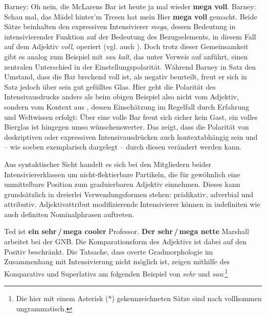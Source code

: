 \ea  \label{Expr01}
\ea Barney: \glqq{}Oh nein, die McLarens Bar ist heute ja mal wieder \textbf{mega voll}.\grqq{}
\hfill \textbf{}  \qquad   \dSadey[1.25][orange!69]     \label{barbar}
\ex Barney: \glqq{}Schau mal, das Mädel hinter'm Tresen hat mein Bier \textbf{mega voll} gemacht.\grqq{}
\hfill {}  \qquad \dSmiley[1.25][green!35]  \label{barbier}
 \z
 \z
Beide Sätze beinhalten den expressiven Intensivierer \textit{mega}, dessen Bedeutung in intensivierender Funktion auf der Bedeutung des Bezugselements, in diesem Fall auf dem Adjektiv \textit{voll}, operiert (vgl. auch \citealt[15f.]{Nouwen.2020}). Doch trotz dieser Gemeinsamkeit gibt es analog zum Beispiel mit \textit{sau kalt}, das {\citet[135]{Gutzmann.2019a}} unter Verweis auf \citet[681]{McCready.2008} anführt, einen zentralen Unterschied in der Einstellungspolarität. Während Barney {in Satz } den Umstand, dass die Bar brechend voll ist, als negativ beurteilt, freut er sich in Satz  jedoch über sein gut gefülltes Glas. Hier geht die Polarität des Intensivausdrucks anders als beim obigen Beispiel  also nicht vom Adjektiv, sondern vom Kontext aus {\citep[vgl.][135]{Gutzmann.2019a}}, dessen Einschätzung im Regelfall durch Erfahrung und Weltwissen erfolgt: Über eine volle Bar freut sich sicher kein Gast, ein volles Bierglas ist hingegen umso wünschenswerter. Das zeigt, dass die Polarität von deskriptiven oder expressiven Intensivausdrücken auch kontextabhängig sein und -- wie soeben exemplarisch dargelegt -- durch diesen verändert werden kann.

Aus syntaktischer Sicht handelt es sich bei den Mitgliedern beider Intensiviererklassen um nicht-flektierbare Partikeln, die für gewöhnlich eine unmittelbare Position zum graduierbaren Adjektiv einnehmen. Dieses kann grundsätzlich in dreierlei Verwendungsformen stehen: prädikativ, {adverbial} und attributiv. Adjektivattribut modifizierende Intensivierer können in indefiniten  wie auch definiten Nominalphrasen  auftreten.

\ea  \label{Adjektivattribut}
\ea Ted ist \textbf{ein sehr\,/\,mega cooler} Professor.  \label{Prof}
\ex \textbf{Der sehr\,/\,mega nette} Marshall arbeitet bei der GNB.   \label{GNB}
 \z
 \z
Die Komparationsform des Adjektivs ist dabei auf den Positiv beschränkt. Die Tatsache, dass overte Gradmorphologie im Zusammenhang mit Intensivierung nicht möglich ist, zeigen \citet[150]{Gutzmann.2012} mithilfe des Komparativs und Superlativs am folgenden Beispiel von \textit{sehr} und \textit{sau}:\footnote{Die hier mit einem Asterisk (*) gekennzeichneten Sätze sind nach \citet[]{Gutzmann.2012} vollkommen ungrammatisch.}

